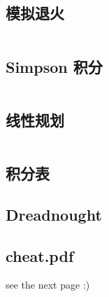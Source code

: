 \documentclass[a4paper,9]{article}
\begin{document}
\subsection{模拟退火}
\inputminted[breaklines]{c++}{others/simulate_anneal.cpp}
\subsection{Simpson 积分}
\inputminted[breaklines]{c++}{others/simpson.cpp}
\subsection{线性规划}
\inputminted[breaklines]{c++}{others/linear-programming.cpp}
\subsection{积分表}

\subsection{Dreadnought}

\newpage
\subsection{cheat.pdf}
see the next page :)


\end{document}
